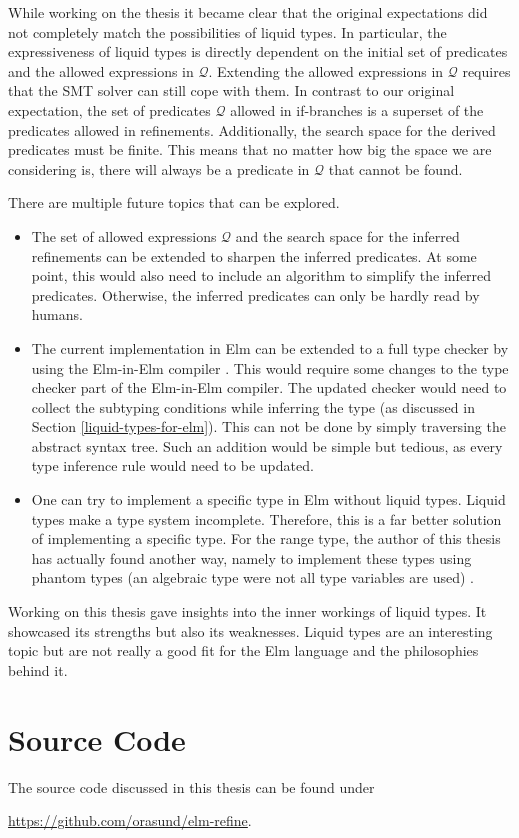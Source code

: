 \documentclass[]{scrbook}
\providecommand{\tightlist}{%
  \setlength{\itemsep}{0pt}\setlength{\parskip}{0pt}}
\theoremstyle{definition}
\theoremstyle{definition}
\theoremstyle{definition}
\theoremstyle{remark}
\begin{document}
While working on the thesis it became clear that the original
expectations did not completely match the possibilities of liquid types.
In particular, the expressiveness of liquid types is directly dependent
on the initial set of predicates and the allowed expressions in
\(\mathcal{Q}\). Extending the allowed expressions in \(\mathcal{Q}\)
requires that the SMT solver can still cope with them. In contrast to
our original expectation, the set of predicates \(\mathcal{Q}\) allowed
in if-branches is a superset of the predicates allowed in refinements.
Additionally, the search space for the derived predicates must be
finite. This means that no matter how big the space we are considering
is, there will always be a predicate in \(\mathcal{Q}\) that cannot be
found.

There are multiple future topics that can be explored.

\begin{itemize}
\tightlist
\item
  The set of allowed expressions \(\mathcal{Q}\) and the search space
  for the inferred refinements can be extended to sharpen the inferred
  predicates. At some point, this would also need to include an
  algorithm to simplify the inferred predicates. Otherwise, the inferred
  predicates can only be hardly read by humans.
\item
  The current implementation in Elm can be extended to a full type
  checker by using the Elm-in-Elm compiler \autocite{elmInElm}. This
  would require some changes to the type checker part of the Elm-in-Elm
  compiler. The updated checker would need to collect the subtyping
  conditions while inferring the type (as discussed in Section
  \ref{liquid-types-for-elm}). This can not be done by simply traversing
  the abstract syntax tree. Such an addition would be simple but
  tedious, as every type inference rule would need to be updated.
\item
  One can try to implement a specific type in Elm without liquid types.
  Liquid types make a type system incomplete. Therefore, this is a far
  better solution of implementing a specific type. For the range type,
  the author of this thesis has actually found another way, namely to
  implement these types using phantom types (an algebraic type were not
  all type variables are used) \autocite{elmStaticArray}.
\end{itemize}

Working on this thesis gave insights into the inner workings of liquid
types. It showcased its strengths but also its weaknesses. Liquid types
are an interesting topic but are not really a good fit for the Elm
language and the philosophies behind it. \newpage

\appendix


\chapter{Source Code}\label{source-code}

The source code discussed in this thesis can be found under

\url{https://github.com/orasund/elm-refine}.

\printbibliography
\end{document}
